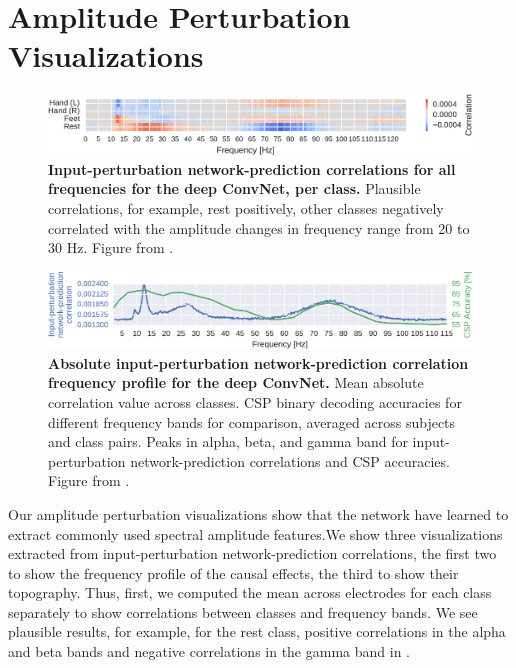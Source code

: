\section{Amplitude Perturbation
Visualizations}\label{amplitude-perturbation-visualizations}



\begin{figure}[t!hb]
    \myfloatalign
    \includegraphics[width=1\linewidth]{images/Bandpower_Perturbation.ipynb.0.pdf-1.png}
    
    \caption[Per-class amplitude perturbation correlation profiles on high-gamma dataset]{
\textbf{Input-perturbation network-prediction correlations for all
frequencies for the deep ConvNet, per class.} Plausible correlations,
for example, rest positively, other classes negatively correlated with
the amplitude changes in frequency range from 20 to 30 Hz. Figure from
\citet{schirrmeisterdeephbm2017}.
}
\label{bandpower-perturbation-per-class-fig}
\end{figure}


\begin{figure}[htb]
    \myfloatalign
    \includegraphics[width=1\linewidth]{images/Bandpower_Perturbation.ipynb.12.pdf-1.png}
    
    \caption[Overall amplitude perturbation correlation profile on high-gamma dataset]{
\textbf{Absolute input-perturbation network-prediction correlation
frequency profile for the deep ConvNet.} Mean absolute correlation value
across classes. CSP binary decoding accuracies for different frequency
bands for comparison, averaged across subjects and class pairs. Peaks in
alpha, beta, and gamma band for input-perturbation network-prediction
correlations and CSP accuracies. Figure from
\citet{schirrmeisterdeephbm2017}.
}
\label{bandpower-overall-fig}
\end{figure}

Our amplitude perturbation visualizations show that the network have
learned to extract commonly used spectral amplitude features.We show
three visualizations extracted from input-perturbation
network-prediction correlations, the first two to show the frequency
profile of the causal effects, the third to show their topography. Thus,
first, we computed the mean across electrodes for each class separately
to show correlations between classes and frequency bands. We see
plausible results, for example, for the rest class, positive
correlations in the alpha and beta bands and negative correlations in
the gamma band in
.



